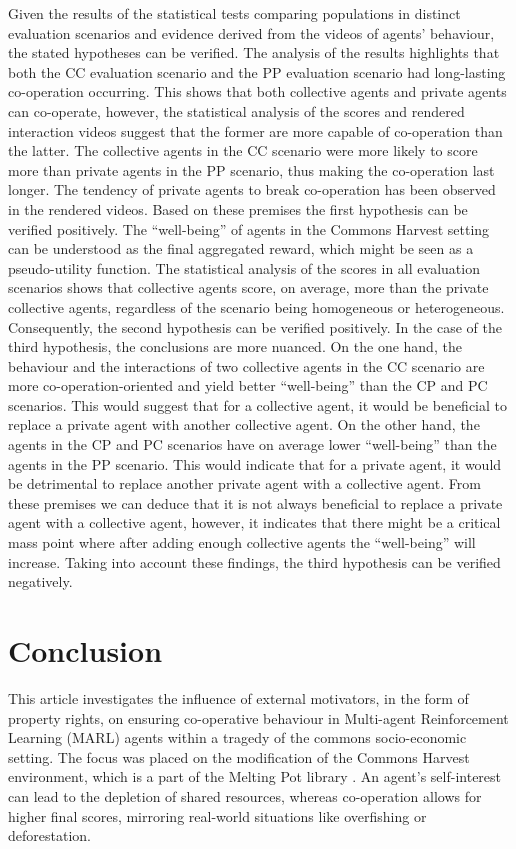 \documentclass[pdflatex,sn-basic,lineno]{sn-jnl}
\theoremstyle{thmstyleone}%
\theoremstyle{thmstyletwo}%
\theoremstyle{thmstylethree}%
\begin{document}
Given the results of the statistical tests comparing populations in distinct evaluation scenarios and evidence derived
from the videos of agents’ behaviour, the stated hypotheses can be verified. The analysis of the results highlights that
both the CC evaluation scenario and the PP evaluation scenario had
long-lasting co-operation occurring. This shows that both collective agents and private agents can co-operate, however,
the statistical analysis of the scores and rendered interaction videos suggest that the former are more
capable of co-operation than the latter.
The collective agents in the CC scenario were more likely to score more than private agents in the PP scenario, thus
making the co-operation last longer. The tendency of private agents to break co-operation has been observed in the
rendered videos. Based on these premises the first hypothesis can be verified positively. The “well-being” of agents in
the Commons Harvest setting can be understood as the final aggregated reward, which might be seen as a pseudo-utility
function. The statistical analysis of the scores in all evaluation scenarios shows that collective agents score, on
average, more than the private collective agents, regardless of the scenario being homogeneous or heterogeneous.
Consequently, the second hypothesis can be verified positively. In the case of the third hypothesis, the conclusions are
more nuanced. On the one hand, the behaviour and the interactions of two collective agents in the CC scenario are more
co-operation-oriented and yield better “well-being” than the CP and PC scenarios. This would suggest that for a
collective agent, it would be beneficial to replace a private agent with another collective agent. On the other hand,
the agents in the CP and PC scenarios have on average lower “well-being” than the agents in the PP scenario. This would
indicate that for a private agent, it would be detrimental to replace another private agent with a collective agent.
From these premises we can deduce that it is not always beneficial to replace a private agent with a collective agent,
however, it indicates that there might be a critical mass point where after adding enough collective agents the
“well-being” will increase. Taking into account these findings, the third hypothesis can be verified negatively.

\section{Conclusion}\label{sec5}


This article investigates the influence of external motivators, in the form of property rights, on ensuring co-operative
behaviour in Multi-agent Reinforcement Learning (MARL) agents within a tragedy of the commons socio-economic setting.
The focus was placed on the modification of the Commons Harvest environment, which is a part of the Melting Pot library
\citep{Leibo2021, agapiou2023meltingpot20}. An agent's self-interest can lead to the depletion of shared resources,
whereas co-operation allows for higher final scores, mirroring real-world situations like overfishing or deforestation.
\end{document}
